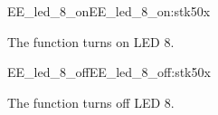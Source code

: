 \begin{function_nopb2}{EE\_led\_8\_on}{EE_led_8_on:stk50x}
  
  \begin{fundescription}
    The function turns on LED 8.
  \end{fundescription}
  
  
  
\end{function_nopb2}

\begin{function_nopb2}{EE\_led\_8\_off}{EE_led_8_off:stk50x}
  
  \begin{fundescription}
    The function turns off LED 8.
  \end{fundescription}
  
  
  
\end{function_nopb2}




